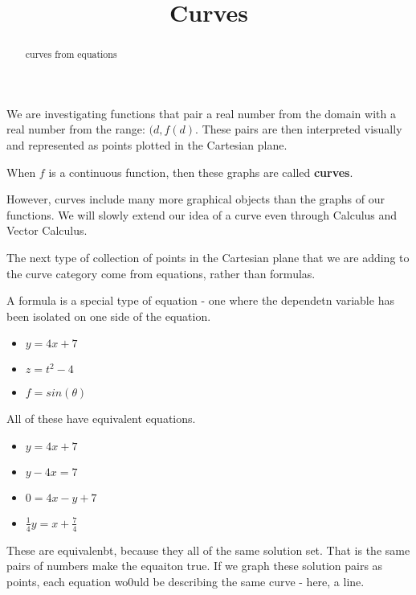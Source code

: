 \documentclass{ximera}
\title{Curves}
\begin{document}
\begin{abstract}
curves from equations
\end{abstract}
\maketitle





We are investigating functions that pair a real number from the domain with a real number from the range: $(d, f(d)$.  These pairs are then interpreted visually and represented as points plotted in the Cartesian plane.

When $f$ is a continuous function, then these graphs are called \textbf{curves}.



However, curves include many more graphical objects than the graphs of our functions.  We will slowly extend our idea of a curve even through Calculus and Vector Calculus.

The next type of collection of points in the Cartesian plane that we are adding to the curve category come from equations, rather than formulas.


A formula is a special type of equation - one where the dependetn variable has been isolated on one side of the equation.

\begin{itemize}
\item $y = 4 x + 7$
\item $z = t^2 - 4$
\item $f =  sin(\theta)$
\end{itemize}



All of these have equivalent equations.


\begin{itemize}
\item $y = 4 x + 7$
\item $y - 4x = 7$
\item $0 = 4x - y + 7$
\item $\frac{1}{4}y = x + \frac{7}{4}$
\end{itemize}


These are equivalenbt, because they all of the same solution set.  That is the same pairs of numbers make the equaiton true.  If we graph these solution pairs as points, each equation wo0uld be describing the same curve - here, a line. \\
\end{document}

